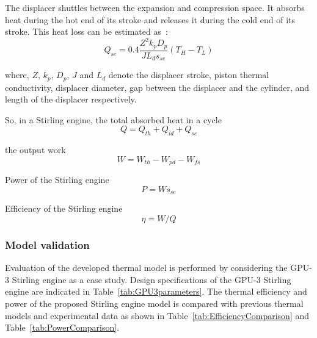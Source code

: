 \begin{enumerate}[label=(\arabic*)]
The displacer shuttles between the expansion and compression space. It absorbs heat during the hot end of its stroke and releases it during the cold end of its stroke. This heat loss can be estimated as~\cite{Timoumi2008}:
\begin{equation}
	Q_{sc} = 0.4\frac{Z^2k_pD_p}{JL_ds_{se}}(T_{H} - T_{L})
\end{equation}

where, $Z$, $k_p$, $D_p$, $J$ and $L_d$ denote the displacer stroke, piston thermal conductivity, displacer diameter, gap between the displacer and the cylinder, and length of the displacer respectively.

\end{enumerate}

So, in a Stirling engine, the total absorbed heat in a cycle
\begin{equation}
	Q = Q_{th} + Q_{id} + Q_{sc}
\end{equation}

the output work
\begin{equation}
	W = W_{th} - W_{pd} - W_{fs}
\end{equation}

Power of the Stirling engine
\begin{equation}
	P = Ws_{se}
	\label{Eq:P}
\end{equation}

Efficiency of the Stirling engine
\begin{equation}
	\eta = W/Q
	\label{Eq:eta}
\end{equation}


\subsubsection{Model validation}\label{sec:modelValidation}

Evaluation of the developed thermal model is performed by considering the GPU-3 Stirling engine as a case study. Design specifications of the GPU-3 Stirling engine are indicated in Table~\ref{tab:GPU3parameters}. The thermal efficiency and power of the proposed Stirling engine model is compared with previous thermal models and experimental data as shown in Table~\ref{tab:EfficiencyComparison} and Table~\ref{tab:PowerComparison}.

